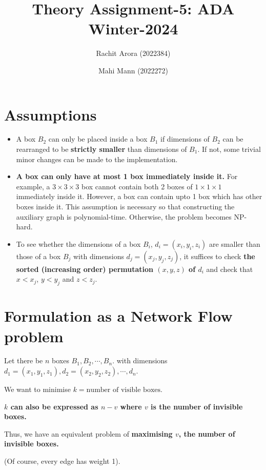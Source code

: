 \documentclass{article}
\title{Theory Assignment-5: ADA Winter-2024}
\author{Rachit Arora (2022384) \and Mahi Mann (2022272)}
\date{}
\begin{document}

\maketitle

\section{Assumptions}

\begin{itemize}
    \item A box $B_2$ can only be placed inside a box $B_1$ if dimensions of $B_2$ can be rearranged to be \textbf{strictly smaller} than dimensions of $B_1$. If not, some trivial minor changes can be made to the implementation. 
    \item \textbf{A box can only have at most 1 box immediately inside it.} For example, a $3 \times 3 \times 3$ box cannot contain both 2 boxes of $1 \times 1 \times 1$ immediately inside it. However, a box can contain upto 1 box which has other boxes inside it. This assumption is necessary so that constructing the auxiliary graph is polynomial-time. Otherwise, the problem becomes NP-hard.

    \item To see whether the dimensions of a box $B_i$, $d_i = (x_i, y_i, z_i)$ are smaller than those of a box $B_j$ with dimensions $d_j = (x_j, y_j, z_j)$, it suffices to check \textbf{the sorted (increasing order) permutation $(x, y, z)$ of $d_i$} and check that $x < x_j$, $y < y_j$ and $z < z_j$.  
\end{itemize}

\section{Formulation as a Network Flow problem}

Let there be $n$ boxes $B_1, B_2, \cdots, B_n$. with dimensions $d_1 = (x_1, y_1, z_1), d_2 = (x_2, y_2, z_2), \cdots, d_n$.

We want to minimise $k = \text{number of visible boxes}$. 

\textbf{$k$ can also be expressed as $n - v$ where $v$ is the number of invisible boxes.}

Thus, we have an equivalent problem of \textbf{maximising $v$, the number of invisible boxes.} 


(Of course, every edge has weight 1).
\end{document}
